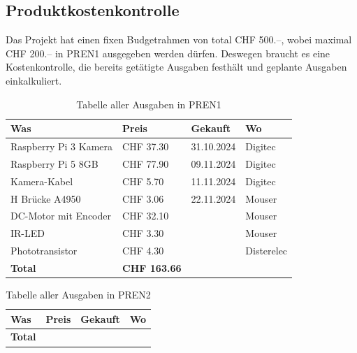 \documentclass[../main.tex]{subfiles}
\begin{document}
\subsection{Produktkostenkontrolle}
Das Projekt hat einen fixen Budgetrahmen von total CHF 500.--, wobei maximal CHF 200.-- in PREN1 ausgegeben werden dürfen. Deswegen braucht es eine Kostenkontrolle, die bereits getätigte Ausgaben festhält und geplante Ausgaben einkalkuliert.
\begin{table}[H]
\begin{tabular}{|p{6cm}|p{2.5cm}|p{2cm}|p{2.5cm}|}
\hline
\textbf{Was} & \textbf{Preis} & \textbf{Gekauft} & \textbf{Wo} \\ \hline
Raspberry Pi 3 Kamera & CHF 37.30 & 31.10.2024 & Digitec \\ \hline
Raspberry Pi 5 8GB & CHF 77.90 & 09.11.2024 & Digitec \\ \hline
Kamera-Kabel & CHF 5.70 & 11.11.2024 & Digitec \\ \hline
H Brücke A4950 & CHF 3.06 & 22.11.2024 & Mouser \\ \hline
DC-Motor mit Encoder & CHF 32.10 & & Mouser \\ \hline
IR-LED & CHF 3.30 & & Mouser \\ \hline
Phototransistor & CHF 4.30 & & Disterelec \\ \hline
\hline
\textbf{Total} & \textbf{CHF 163.66} & & \\ \hline
\end{tabular}
\caption{Tabelle aller Ausgaben in PREN1}
\label{tab:werkzeugtabelle}
\end{table}

\begin{table}[H]
\begin{tabular}{|p{6cm}|p{2.5cm}|p{2cm}|p{2.5cm}|}
\hline
\textbf{Was} & \textbf{Preis} & \textbf{Gekauft} & \textbf{Wo} \\ \hline

\hline
\textbf{Total} & \textbf{} & & \\ \hline
\end{tabular}
\caption{Tabelle aller Ausgaben in PREN2}
\label{tab:werkzeugtabelle}
\end{table}
\end{document}
